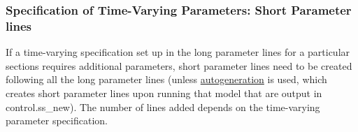 	 
\subsubsection{Specification of Time-Varying Parameters: Short Parameter lines} 

If a time-varying specification set up in the long parameter lines for a particular sections requires additional parameters, short parameter lines need to be created following all the long parameter lines (unless \hyperlink{autogen}{autogeneration} is used, which creates short parameter lines upon running that model that are output in control.ss_new). The number of lines added depends on the time-varying parameter specification.

